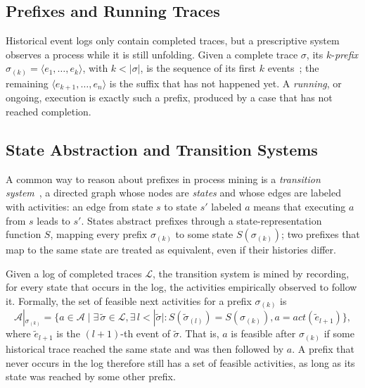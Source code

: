 \subsection{Prefixes and Running Traces}
    \label{subsec:bg:pm:prefix}
    Historical event logs only contain completed traces, but a prescriptive
    system observes a process while it is still unfolding. Given a complete trace
    $\sigma$, its $k$-\emph{prefix} $\sigma_{(k)} = \langle e_1, \dots, e_k
    \rangle$, with $k < |\sigma|$, is the sequence of its first $k$
    events~\cite{le2025balancing}; the
    remaining $\langle e_{k+1}, \dots, e_n \rangle$ is the suffix that has not
    happened yet. A \emph{running}, or ongoing, execution is exactly such a
    prefix, produced by a case that has not reached completion.

\subsection{State Abstraction and Transition Systems}
    \label{subsec:bg:pm:ts}
    A common way to reason about prefixes in process mining is a
    \emph{transition system}~\cite{vanderaalst2016}, a
    directed graph whose nodes are \emph{states} and whose edges are labeled
    with activities: an edge from state $s$ to state $s'$ labeled $a$ means
    that executing $a$ from $s$ leads to $s'$. States abstract prefixes
    through a state-representation function $S$, mapping every prefix
    $\sigma_{(k)}$ to some state $S(\sigma_{(k)})$; two prefixes that map to
    the same state are treated as equivalent, even if their histories differ.
    
    Given a log of completed traces $\mathcal{L}$, the transition system is
    mined by recording, for every state that occurs in the log, the
    activities empirically observed to follow it. Formally, the set of
    feasible next activities for a prefix $\sigma_{(k)}$
    is~\cite{le2025balancing}
    \begin{equation}
    \mathcal{A}|_{\sigma_{(k)}} = \{a \in \mathcal{A} \mid \exists\, \tilde\sigma
    \in \mathcal{L}, \exists\, l < |\tilde\sigma| : S(\tilde\sigma_{(l)}) =
    S(\sigma_{(k)}), a = act(\tilde e_{l+1})\},
    \label{eq:bg:pm:feasible}
    \end{equation}
    where $\tilde e_{l+1}$ is the $(l+1)$-th event of $\tilde\sigma$.
    That is, $a$ is feasible after $\sigma_{(k)}$ if some historical trace
    reached the same state and was then followed by $a$. A prefix that never
    occurs in the log therefore still has a set of feasible activities, as
    long as its state was reached by some other prefix.

